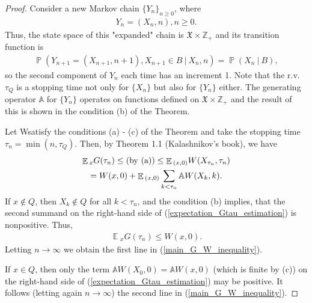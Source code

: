 \documentclass[10pt, reqno]{amsart}
\theoremstyle{definition}
\newcommand{\aasVar}{Q} %
\newcommand{\astVar}{\tau} %
\newcommand{\gtfVar}{G} %
\newcommand{\wtfVar}{W} %
\newcommand{\atoVar}{\mathbb{A}} %
\newcommand{\assVar}{\mathfrak{X}} %
\newcommand{\integers}{\mathbb{Z}} %
\DeclareMathOperator*{\E}{\mathbb{E}}
\DeclareMathOperator*{\Pb}{\mathbb{P}}
\begin{document}
	\begin{proof}
		Consider a new Markov chain $\{Y_{n}\}_{n \geq 0}$, where
		\begin{gather*}
			Y_{n} = (X_{n}, n), n \geq 0.
		\end{gather*}
		Thus, the state space of this "expanded" chain is $\assVar \times \integers_{+}$ and its transition function is
		\begin{gather*}
			\Pb(Y_{n+1} = (X_{n+1}, n+1), X_{n+1} \in B \: | \: X_{n}, n) = \Pb(X_{n} \: | \: B),
		\end{gather*}
		so the second component of $Y_{n}$ each time has an increment 1. Note that the r.v. $\astVar_{\aasVar}$ is a stopping time not only for $\{X_{n}\}$ but also for $\{Y_{n}\}$ either. The generating operator $\atoVar$ for $\{Y_{n}\}$ operates on functions defined on $\assVar \times \integers_{+}$ and the result of this is shown in the condition (b) of the Theorem.
		
		Let \wtfVar satisfy the conditions (a) - (c) of the Theorem and take the stopping time $\astVar_{n} = \min(n, \astVar_{\aasVar})$. Then, by Theorem 1.1 (Kalashnikov's book), we have
		\begin{gather}
			\E{}_{x}\gtfVar(\astVar_{n}) \leq \text{(by (a))} \leq \E{}_{(x, 0)}\wtfVar(X_{\astVar_{n}}, \astVar_{n}) \notag \\ = \wtfVar(x, 0) + \E{}_{(x, 0)}\sum_{k < \astVar_{n}}\atoVar\wtfVar(X_{k}, k).
			\label{expectation_Gtau_estimation}
		\end{gather}
		If $x \notin \aasVar$, then $X_{k} \notin \aasVar$ for all $k < \astVar_{n}$, and the condition (b) implies, that the second summand on the right-hand side of (\ref{expectation_Gtau_estimation}) is nonpositive. Thus,
		\begin{gather*}
			\E{}_{x}\gtfVar(\astVar_{n}) \leq \wtfVar(x, 0).
		\end{gather*}
		Letting $n \xrightarrow{} \infty$ we obtain the first line in (\ref{main_G_W_inequality}).
		
		If $x \in \aasVar$, then only the term $\atoVar\wtfVar(X_{0}, 0) = \atoVar\wtfVar(x, 0)$ (which is finite by (c)) on the right-hand side of (\ref{expectation_Gtau_estimation}) may be positive. It follows (letting again $n \xrightarrow{} \infty$) the second line in (\ref{main_G_W_inequality}).
		

\end{proof}
\end{document}
